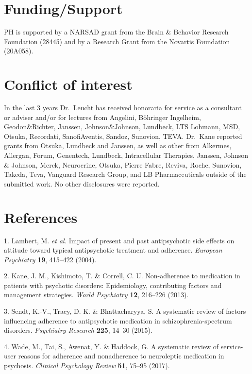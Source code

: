 \documentclass[9pt,english,,jou,floatsintext]{apa6}
\begin{document}
\section{Funding/Support}\label{fundingsupport}

PH is supported by a NARSAD grant from the Brain \& Behavior Research
Foundation (28445) and by a Research Grant from the Novartis Foundation
(20A058).

\section{Conflict of interest}\label{conflict-of-interest}

In the last 3 years Dr.~Leucht has received honoraria for service as a
consultant or adviser and/or for lectures from Angelini, Böhringer
Ingelheim, Geodon\&Richter, Janssen, Johnson\&Johnson, Lundbeck, LTS
Lohmann, MSD, Otsuka, Recordati, SanofiAventis, Sandoz, Sunovion, TEVA.
Dr.~Kane reported grants from Otsuka, Lundbeck and Janssen, as well as
other from Alkermes, Allergan, Forum, Genentech, Lundbeck, Intracellular
Therapies, Janssen, Johnson \& Johnson, Merck, Neurocrine, Otsuka,
Pierre Fabre, Reviva, Roche, Sunovion, Takeda, Teva, Vanguard Research
Group, and LB Pharmaceuticals outside of the submitted work. No other
disclosures were reported.

\section{References}\label{references}

\hypertarget{refs}{}
\hypertarget{ref-Lambert2004}{}
1. Lambert, M. \emph{et al.} Impact of present and past antipsychotic
side effects on attitude toward typical antipsychotic treatment and
adherence. \emph{European Psychiatry} \textbf{19}, 415--422 (2004).

\hypertarget{ref-Kane2013}{}
2. Kane, J. M., Kishimoto, T. \& Correll, C. U. Non-adherence to
medication in patients with psychotic disorders: Epidemiology,
contributing factors and management strategies. \emph{World Psychiatry}
\textbf{12}, 216--226 (2013).

\hypertarget{ref-Sendt2015}{}
3. Sendt, K.-V., Tracy, D. K. \& Bhattacharyya, S. A systematic review
of factors influencing adherence to antipsychotic medication in
schizophrenia-spectrum disorders. \emph{Psychiatry Research}
\textbf{225}, 14--30 (2015).

\hypertarget{ref-Wade2017}{}
4. Wade, M., Tai, S., Awenat, Y. \& Haddock, G. A systematic review of
service-user reasons for adherence and nonadherence to neuroleptic
medication in psychosis. \emph{Clinical Psychology Review} \textbf{51},
75--95 (2017).
\end{document}
